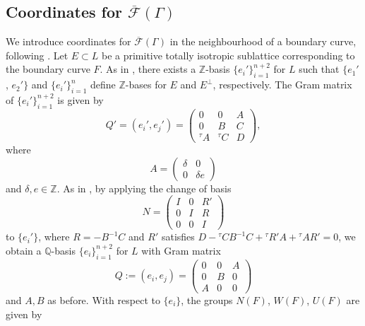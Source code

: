 \documentclass[12pt, a4paper]{article}
\newcommand{\ZZ}{\mathbb{Z}}
\newcommand{\QQ}{\mathbb{Q}}
\newcommand{\fc}{\mathcal{F}}
\begin{document}
\subsection{Coordinates for $\overline{\fc}(\Gamma)$}
We introduce coordinates for $\overline{\fc}(\Gamma)$ in the neighbourhood of a boundary curve, following \cite{Kondo, GHSK3, scattone}.
Let $E \subset L$ be a primitive totally isotropic sublattice  corresponding to the boundary curve $F$.
As in \cite[Lemma 2.23]{GHSK3}, there exists a $\ZZ$-basis $\{e_i'\}_{i=1}^{n+2}$ for $L$ such that 
$\{e_1'$, $e_2'\}$ and 
$\{e_i'\}_{i=1}^n$
define $\ZZ$-bases for $E$ and $E^{\perp}$, respectively.
The Gram matrix of $\{e_i'\}_{i=1}^{n+2}$ is given by 
\begin{equation}\label{Q'def}
  Q'
  = (e_i', e_j')
  = \begin{pmatrix}
    0 & 0 & A \\
    0 & B & C \\
    {}^{\tau}A & {}^{\tau}C & D
  \end{pmatrix},
\end{equation}
where 
\begin{equation}\label{Adeltae}
  A =
  \begin{pmatrix}
    \delta & 0 \\
    0 & \delta e
  \end{pmatrix}
\end{equation}
and $\delta, e \in \ZZ$. 
As in \cite[Lemma 2.24]{GHSK3}, by applying the change of basis 
\begin{equation}\label{basechangeN}
  N =
  \begin{pmatrix}
    I & 0 & R' \\
    0 & I & R \\
    0 & 0 & I
  \end{pmatrix}
\end{equation}
to $\{e_i'\}$, where $R = -B^{-1} C$ and $R'$ satisfies
 $ D  - {}^{\tau} CB^{-1}C + {}^{\tau}R'A + {}^{\tau}AR' = 0$, we obtain a $\QQ$-basis $\{e_i\}_{i=1}^{n+2}$ for $L$ with Gram matrix
\begin{equation}\label{Qdef}
  Q :=
  (e_i, e_j)
  =
  \begin{pmatrix}
    0 & 0 & A \\
    0 & B & 0 \\
    A & 0 & 0
  \end{pmatrix}
\end{equation}
and $A, B$ as before. 
With respect to $\{e_i\}$, the groups $N(F)$, $W(F)$, $U(F)$ are given by \cite[Lemma 2.25]{GHSK3}  
\end{document}
